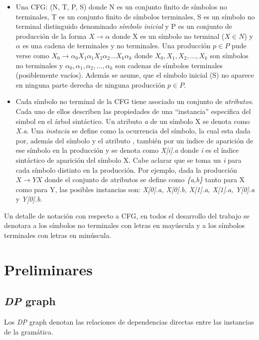 \begin{itemize}
\item Una CFG: (N, T, P, S) donde N es un conjunto finito de símbolos no terminales, T es un conjunto finito de símbolos terminales, S es un símbolo no terminal distinguido denominado \textit{símbolo inicial} y P es un conjunto de producción de la forma $X\rightarrow\alpha$ donde X es un símbolo no terminal ($X\in N$) y $\alpha$ es una cadena de terminales y no terminales. Una producción $\textit{p}\in P$ pude verse como
 $X_{0}\rightarrow\alpha_{0}X_{1}\alpha_{1}X_{2}\alpha_{2}\dots X_{k}\alpha_{k}$ 
donde \textit{$X_{0}, X_{1}, X_{2},\dots, X_{k}$} son símbolos no terminales y  \textit{$\alpha_{0}, \alpha_{1}, \alpha_{2}, \dots, \alpha_{k}$} son cadenas de símbolos terminales (posiblemente vacíos). Además se asume, que el símbolo inicial (S) no aparece en ninguna parte derecha de ninguna producción $\textit{p} \in P.$
\item Cada símbolo no terminal de la CFG tiene asociado un conjunto de \textit{atributos}. Cada uno de ellos describen las propiedades de una ``instancia'' especifica del simbol en el árbol sintáctico. Un atributo \textit{a} de un símbolo X se denota como \textit{X.a}. Una \textit{instacia} se define como la ocurrencia del símbolo, la cual esta dada por, además del símbolo y el atributo , también por un índice de aparición de ese símbolo en la producción y se denota como \textit{X[i].a} donde \textit{i} es el índice sintáctico de aparición del símbolo X. Cabe aclarar que se toma un \textit{i} para cada símbolo distinto en la producción. Por ejemplo, dada la producción $X\rightarrow Y X$ donde el conjunto de atributos se define como \textit{\{a,b\}} tanto para X como para Y, las posibles instancias son: \textit{X[0].a, X[0].b, X[1].a, X[1].a, Y[0].a} y \textit{Y[0].b}.
\end{itemize}

Un detalle de notación con respecto a CFG, en todos el desarrollo del trabajo se denotara a los símbolos no terminales con letras en mayúscula y a los símbolos terminales con letras en minúscula.

\section{Preliminares}

\subsection{\textit{DP} graph}
Los \textit{DP} graph denotan las relaciones de dependencias directas entre las instancias de la gramática. 

